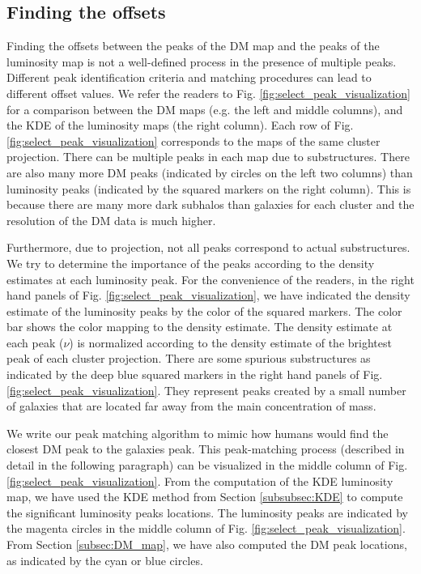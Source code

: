 \subsection{Finding the offsets} \label{subsec:offsets}
Finding the offsets between the peaks of the DM map and the peaks of the 
luminosity map is not a well-defined process in the presence of multiple peaks. 
Different peak identification criteria and matching
procedures can lead to different offset values. 
We refer the readers to Fig. \ref{fig:select_peak_visualization} for a comparison
between the DM maps (e.g. the left and middle columns), and 
the KDE of the luminosity maps (the right column).
Each row of Fig. \ref{fig:select_peak_visualization} corresponds to the maps of
the same cluster projection.
There can be multiple peaks in each map due to substructures. 
There are also many more DM peaks (indicated by circles on the left two columns) 
than luminosity peaks (indicated by the squared markers on the right column).
This is because there are many more dark subhalos than galaxies for each cluster and 
the resolution of the DM data is much higher. 

Furthermore, due to projection, not all peaks correspond to actual substructures.
We try to determine the importance of the peaks according to the density 
estimates at each luminosity peak. For the convenience of the readers, 
in the right hand panels of Fig. \ref{fig:select_peak_visualization},
we have indicated the density estimate of the luminosity peaks 
by the color of the squared markers. 
The color bar shows the color mapping to the density estimate.
The density estimate at each peak ($\nu$) is normalized according to the density
estimate of the brightest peak of each cluster projection. 
There are some spurious substructures as indicated by 
the deep blue squared markers in the right hand panels of Fig.
\ref{fig:select_peak_visualization}.
They represent peaks created by a small number of galaxies that
are located far away from the main concentration of mass.

We write our peak matching algorithm to mimic how humans would
find the closest DM peak to the galaxies peak. 
This peak-matching process (described in detail in the following paragraph) 
can be visualized in the middle column of 
Fig. \ref{fig:select_peak_visualization}.
From the computation of the KDE luminosity map,
we have used the KDE method from Section \ref{subsubsec:KDE} to compute 
the significant luminosity peaks locations. 
The luminosity peaks are indicated by the magenta circles in the middle column
of Fig. \ref{fig:select_peak_visualization}.
From Section \ref{subsec:DM_map}, we have also computed the DM peak locations, 
as indicated by the cyan or blue circles.

